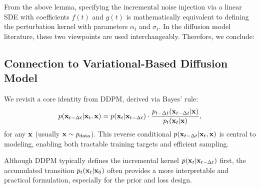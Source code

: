

From the above lemma, specifying the incremental noise injection via a linear SDE with coefficients $f(t)$ and $g(t)$ is mathematically equivalent to defining the perturbation kernel with parameters $\alpha_t$ and $\sigma_t$. In the diffusion model literature, these two viewpoints are used interchangeably. Therefore, we conclude:


\subsection{Connection to Variational-Based Diffusion Model}\label{subsec:connection-vdm}
We revisit a core identity from DDPM, derived via Bayes’ rule:
\begin{align}\label{eq:ddpm-reverse-condition-kernel}
    p({\mathbf{x}}_{t-\Delta t}|{\mathbf{x}}_t, {\mathbf{x}}) = p({\mathbf{x}}_t|{\mathbf{x}}_{t-\Delta t}) \cdot \frac{p_{t-\Delta t}({\mathbf{x}}_{t-\Delta t}|{\mathbf{x}})}{p_t({\mathbf{x}}_t|{\mathbf{x}})},
\end{align}
for any ${\mathbf{x}}$ (usually ${\mathbf{x}}\sim p_{\mathrm{data}}$). This reverse conditional $ p({\mathbf{x}}_{t-\Delta t} | {\mathbf{x}}_t, {\mathbf{x}}) $ is central to modeling, enabling both tractable training targets and efficient sampling.

Although DDPM typically defines the incremental kernel $p({\mathbf{x}}_t|{\mathbf{x}}_{t-\Delta t})$ first, the accumulated transition $p_t({\mathbf{x}}_t|{\mathbf{x}}_0)$ often provides a more interpretable and practical formulation, especially for the prior and loss design.

